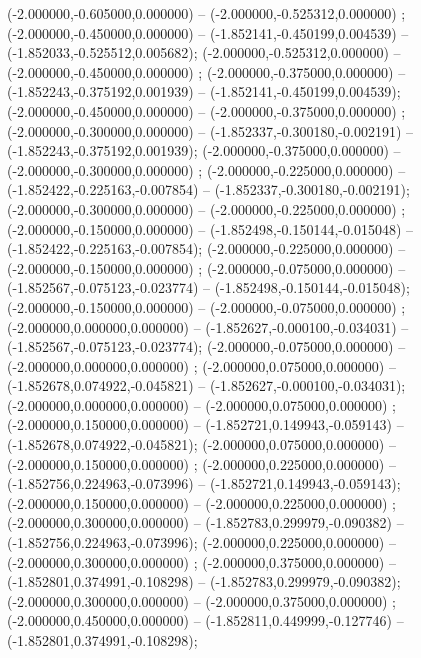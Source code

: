  (-2.000000,-0.605000,0.000000) -- (-2.000000,-0.525312,0.000000) ;
 (-2.000000,-0.450000,0.000000) -- (-1.852141,-0.450199,0.004539) -- (-1.852033,-0.525512,0.005682);
 (-2.000000,-0.525312,0.000000) -- (-2.000000,-0.450000,0.000000) ;
 (-2.000000,-0.375000,0.000000) -- (-1.852243,-0.375192,0.001939) -- (-1.852141,-0.450199,0.004539);
 (-2.000000,-0.450000,0.000000) -- (-2.000000,-0.375000,0.000000) ;
 (-2.000000,-0.300000,0.000000) -- (-1.852337,-0.300180,-0.002191) -- (-1.852243,-0.375192,0.001939);
 (-2.000000,-0.375000,0.000000) -- (-2.000000,-0.300000,0.000000) ;
 (-2.000000,-0.225000,0.000000) -- (-1.852422,-0.225163,-0.007854) -- (-1.852337,-0.300180,-0.002191);
 (-2.000000,-0.300000,0.000000) -- (-2.000000,-0.225000,0.000000) ;
 (-2.000000,-0.150000,0.000000) -- (-1.852498,-0.150144,-0.015048) -- (-1.852422,-0.225163,-0.007854);
 (-2.000000,-0.225000,0.000000) -- (-2.000000,-0.150000,0.000000) ;
 (-2.000000,-0.075000,0.000000) -- (-1.852567,-0.075123,-0.023774) -- (-1.852498,-0.150144,-0.015048);
 (-2.000000,-0.150000,0.000000) -- (-2.000000,-0.075000,0.000000) ;
 (-2.000000,0.000000,0.000000) -- (-1.852627,-0.000100,-0.034031) -- (-1.852567,-0.075123,-0.023774);
 (-2.000000,-0.075000,0.000000) -- (-2.000000,0.000000,0.000000) ;
 (-2.000000,0.075000,0.000000) -- (-1.852678,0.074922,-0.045821) -- (-1.852627,-0.000100,-0.034031);
 (-2.000000,0.000000,0.000000) -- (-2.000000,0.075000,0.000000) ;
 (-2.000000,0.150000,0.000000) -- (-1.852721,0.149943,-0.059143) -- (-1.852678,0.074922,-0.045821);
 (-2.000000,0.075000,0.000000) -- (-2.000000,0.150000,0.000000) ;
 (-2.000000,0.225000,0.000000) -- (-1.852756,0.224963,-0.073996) -- (-1.852721,0.149943,-0.059143);
 (-2.000000,0.150000,0.000000) -- (-2.000000,0.225000,0.000000) ;
 (-2.000000,0.300000,0.000000) -- (-1.852783,0.299979,-0.090382) -- (-1.852756,0.224963,-0.073996);
 (-2.000000,0.225000,0.000000) -- (-2.000000,0.300000,0.000000) ;
 (-2.000000,0.375000,0.000000) -- (-1.852801,0.374991,-0.108298) -- (-1.852783,0.299979,-0.090382);
 (-2.000000,0.300000,0.000000) -- (-2.000000,0.375000,0.000000) ;
 (-2.000000,0.450000,0.000000) -- (-1.852811,0.449999,-0.127746) -- (-1.852801,0.374991,-0.108298);
